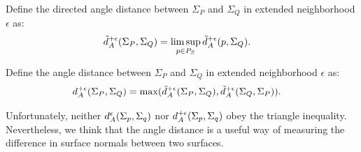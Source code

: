 Define the directed angle distance between $\Sigma_P$ and $\Sigma_Q$
in extended neighborhood $\epsilon$ as:
\begin{align*}
\tilde{d}_A^{+\epsilon}(\Sigma_P,\Sigma_Q) & = \limsup_{p \in P_S} \tilde{d}_A^{+\epsilon}(p,\Sigma_Q).
\end{align*}

Define the angle distance between $\Sigma_P$ and $\Sigma_Q$
in extended neighborhood $\epsilon$ as:
\begin{align*}
d_A^{+\epsilon}(\Sigma_P,\Sigma_Q) & = 
\max(\tilde{d}_A^{+\epsilon}(\Sigma_P,\Sigma_Q), \tilde{d}_A^{+\epsilon}(\Sigma_Q,\Sigma_P)).
\end{align*}

Unfortunately, neither $d_A^\epsilon(\Sigma_p, \Sigma_q)$
nor $d_A^{+\epsilon}(\Sigma_p, \Sigma_q)$ obey the triangle inequality.
Nevertheless, we think that the angle distance is a useful way
of measuring the difference in surface normals between two surfaces.


